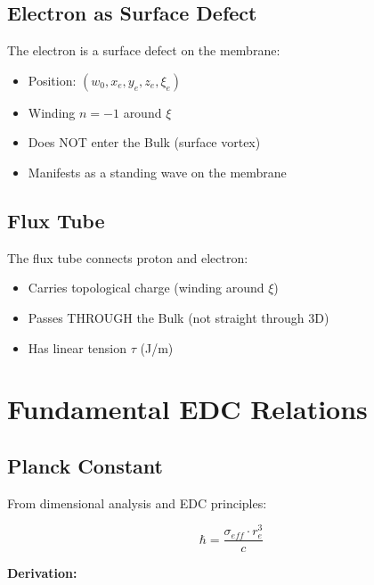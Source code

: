 \documentclass[12pt,a4paper]{article}
\begin{document}
\subsection{Electron as Surface Defect}

The electron is a surface defect on the membrane:

\begin{itemize}
    \item Position: $(w_0, x_e, y_e, z_e, \xi_e)$
    \item Winding $n = -1$ around $\xi$
    \item Does NOT enter the Bulk (surface vortex)
    \item Manifests as a standing wave on the membrane
\end{itemize}

\subsection{Flux Tube}

The flux tube connects proton and electron:

\begin{itemize}
    \item Carries topological charge (winding around $\xi$)
    \item Passes THROUGH the Bulk (not straight through 3D)
    \item Has linear tension $\tau$ (J/m)
\end{itemize}

\section{Fundamental EDC Relations}

\subsection{Planck Constant}

From dimensional analysis and EDC principles:

\begin{keyresult}
\begin{equation}
\boxed{\hbar = \frac{\sigma_{eff} \cdot r_e^3}{c}}
\end{equation}
\end{keyresult}

\textbf{Derivation:}
\end{document}
